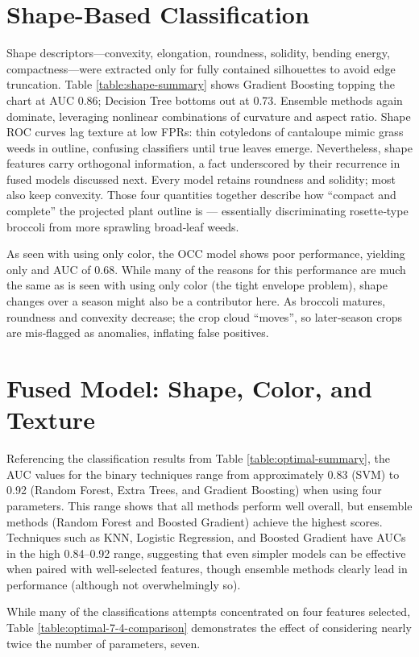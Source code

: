 \documentclass[letterpaper, notitlepage]{report}
\begin{document}
\section{Shape-Based Classification}
Shape descriptors—convexity, elongation, roundness, solidity, bending energy, compactness—were extracted
only for fully contained silhouettes to avoid edge truncation. Table \ref{table:shape-summary} shows Gradient Boosting topping
the chart at AUC 0.86; Decision Tree bottoms out at 0.73. Ensemble methods again dominate, leveraging
nonlinear combinations of curvature and aspect ratio. Shape ROC curves lag texture at low FPRs: thin
cotyledons of cantaloupe mimic grass weeds in outline, confusing classifiers until true leaves emerge. Nevertheless,
shape features carry orthogonal information, a fact underscored by their recurrence in fused models
discussed next.  Every model retains roundness and solidity; most also keep convexity. Those four quantities together describe how “compact and complete” the projected plant outline is --- essentially discriminating rosette‑type broccoli from more sprawling broad‑leaf weeds.

As seen with using only color, the \gls{OCC} model shows poor performance, yielding only and AUC of 0.68. While many of the reasons for this performance are much the same as is seen with using only color (the tight envelope problem), shape changes over a season might also be a contributor here. As broccoli matures, roundness and convexity decrease; the crop cloud “moves”, so later‑season crops are mis‑flagged as anomalies, inflating false positives.

\section{Fused Model: Shape, Color, and Texture}
Referencing the classification results from Table \ref{table:optimal-summary}, the \gls{AUC} values for the binary techniques range from approximately 0.83 (\gls{SVM}) to 0.92 (Random Forest, Extra Trees, and Gradient Boosting) when using four parameters. This range shows that all methods perform well overall, but ensemble methods (Random Forest and Boosted Gradient) achieve the highest scores.
Techniques such as KNN, Logistic Regression, and Boosted Gradient have AUCs in the high 0.84–0.92 range, suggesting that even simpler models can be effective when paired with well-selected features, though ensemble methods clearly lead in performance (although not overwhelmingly so).

While many of the classifications attempts concentrated on four features selected, Table \ref{table:optimal-7-4-comparison} demonstrates the effect of considering nearly twice the number of parameters, seven.
\end{document}

